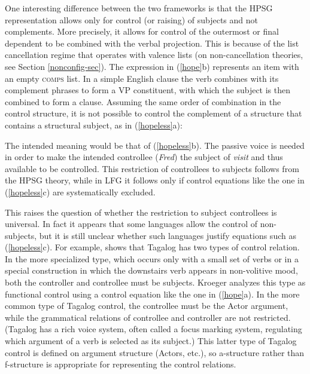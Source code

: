 \noindent
One interesting difference between the two frameworks is that the HPSG representation allows only for control (or raising) of subjects and not complements.  More precisely, it allows for control of the outermost or final dependent to be combined with the verbal projection.  This is because of the list cancellation regime that operates with valence lists (on non-cancellation theories, see Section \ref{nonconfig-sec}).  The expression  in  (\ref{hope}b) represents an item with an empty \textsc{comps} list.  In a simple English clause the verb combines with its complement phrases to form a VP constituent, with which the subject is then combined to form a clause.  Assuming the same order of combination in the control structure, it is not possible to control the complement of a structure that contains a structural subject, as in (\ref{hopeless}a):

\begin{exe} 
\ex 
\label{hopeless}
\begin{xlist}
\end{xlist}
\end{exe}
The intended meaning would be that of (\ref{hopeless}b).  The passive voice is needed in order to make the intended controllee (\textit{Fred})  the subject of \textit{visit} and thus available to be controlled.  This restriction of controllees to subjects follows from the HPSG theory, while in LFG it follows only if control equations  
 like the one in (\ref{hopeless}c) are systematically excluded.    

This raises the question of whether the restriction to subject controllees is universal.  In fact it appears that some languages allow the control of non-subjects, but it is still unclear whether such languages justify equations such as (\ref{hopeless}c).  For example,   \citet{kroeger:1993} shows that Tagalog has two types of control relation.  In the more specialized type, which occurs only with a small set of verbs or in a special construction in which the downstairs verb appears in non-volitive mood, both the controller and controllee must be subjects.  
Kroeger analyzes this type as functional control using a control equation like the one in (\ref{hope}a).  In the more common type of Tagalog control, the controllee must be the Actor argument, while the grammatical relations of controllee and controller are not restricted.  (Tagalog has a rich voice system, often called a focus marking system, regulating which argument of a verb is selected as its subject.)  
This latter type of Tagalog control is defined on argument structure (Actors, etc.), so a-structure rather than f-structure is appropriate for representing the control relations.    


